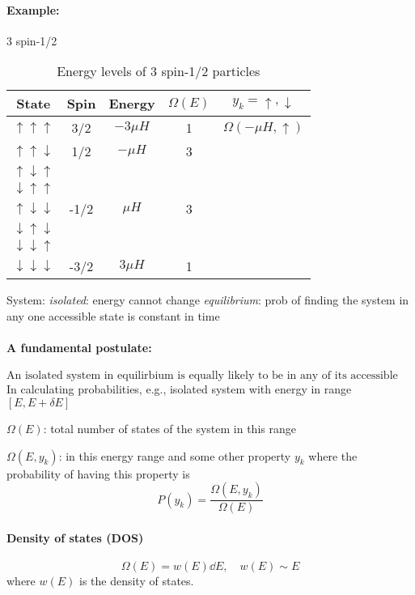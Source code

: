 \documentclass[../main.tex]{subfiles}
\begin{document}
\paragraph*{Example:} 3 spin-1/2
\begin{table} [ht]
    \begin{center}
    \begin{tabular}{c|c|c|c|c}
        State & Spin & Energy & $\Omega(E)$ & $y_k = \uparrow, \downarrow$ \\
        \hline
        $\uparrow\uparrow\uparrow$ & 3/2 & $-3\mu H$ & 1 & $\Omega(-\mu H, \uparrow)$ \\
        $\uparrow\uparrow\downarrow$ & 1/2 & $-\mu H$ & 3 \\
        $\uparrow\downarrow\uparrow$ & & & \\
        $\downarrow\uparrow\uparrow$ & & & \\
        $\uparrow\downarrow\downarrow$ & -1/2 & $\mu H$ & 3 \\
        $\downarrow\uparrow\downarrow$ & & & \\
        $\downarrow\downarrow\uparrow$ & & & \\
        $\downarrow\downarrow\downarrow$ & -3/2 & $3\mu H$ & 1
    \end{tabular}
    \end{center}
    \caption{Energy levels of 3 spin-1/2 particles}
\end{table}

System: \emph{isolated}: energy cannot change
\emph{equilibrium}: prob of finding the system in any one accessible state is constant in time

\paragraph*{A fundamental postulate:}
\[\boxed{\textrm{An isolated system in equilirbium is equally likely to be in any of its accessible states}}\]
In calculating probabilities, e.g., isolated system with energy in range $[E, E+\delta E]$

$\Omega(E)$: total number of states of the system in this range

$\Omega(E,y_k)$: in this energy range and some other property $y_k$
where the probability of having this property is
\[P(y_k) = \frac{\Omega(E,y_k)}{\Omega(E)}\]

\paragraph*{Density of states (DOS)}
\[\Omega(E) = w(E) \dd E, \quad w(E) \sim E\]
where $w(E)$ is the density of states.
\end{document}
